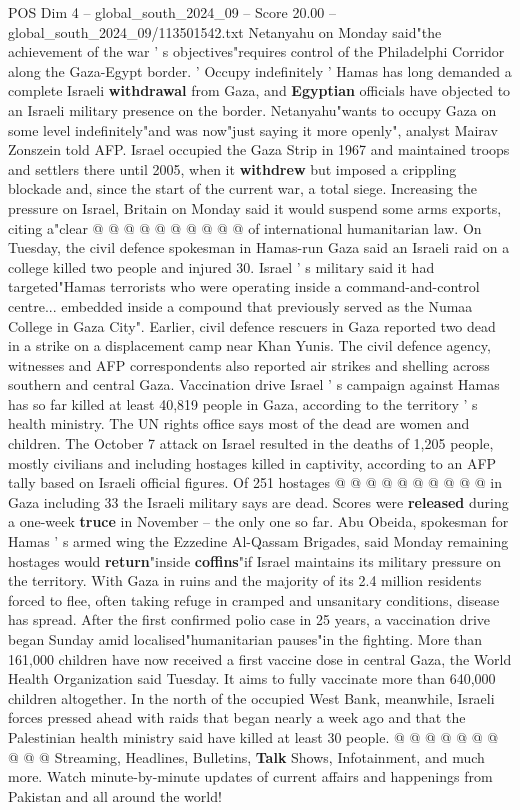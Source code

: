 \begin{textsample}{POS Dim 4 – global\_south\_2024\_09 – Score 20.00 – global\_south\_2024\_09/113501542.txt}
Netanyahu on Monday said"the achievement of the war ' s objectives"requires control of the Philadelphi Corridor along the Gaza-Egypt border. ' Occupy indefinitely ' Hamas has long demanded a complete Israeli \textbf{withdrawal} from Gaza, and \textbf{Egyptian} officials have objected to an Israeli military presence on the border.
Netanyahu"wants to occupy Gaza on some level indefinitely"and was now"just saying it more openly", analyst Mairav Zonszein told AFP.
Israel occupied the Gaza Strip in 1967 and maintained troops and settlers there until 2005, when it \textbf{withdrew} but imposed a crippling blockade and, since the start of the current war, a total siege.
Increasing the pressure on Israel, Britain on Monday said it would suspend some arms exports, citing a"clear @ @ @ @ @ @ @ @ @ @ of international humanitarian law.
On Tuesday, the civil defence spokesman in Hamas-run Gaza said an Israeli raid on a college killed two people and injured 30.
Israel ' s military said it had targeted"Hamas terrorists who were operating inside a command-and-control centre... embedded inside a compound that previously served as the Numaa College in Gaza City".
Earlier, civil defence rescuers in Gaza reported two dead in a strike on a displacement camp near Khan Yunis.
The civil defence agency, witnesses and AFP correspondents also reported air strikes and shelling across southern and central Gaza.
Vaccination drive Israel ' s campaign against Hamas has so far killed at least 40,819 people in Gaza, according to the territory ' s health ministry.
The UN rights office says most of the dead are women and children.
The October 7 attack on Israel resulted in the deaths of 1,205 people, mostly civilians and including hostages killed in captivity, according to an AFP tally based on Israeli official figures.
Of 251 hostages @ @ @ @ @ @ @ @ @ @ in Gaza including 33 the Israeli military says are dead.
Scores were \textbf{released} during a one-week \textbf{truce} in November -- the only one so far.
Abu Obeida, spokesman for Hamas ' s armed wing the Ezzedine Al-Qassam Brigades, said Monday remaining hostages would \textbf{return}"inside \textbf{coffins}"if Israel maintains its military pressure on the territory.
With Gaza in ruins and the majority of its 2.4 million residents forced to flee, often taking refuge in cramped and unsanitary conditions, disease has spread.
After the first confirmed polio case in 25 years, a vaccination drive began Sunday amid localised"humanitarian pauses"in the fighting.
More than 161,000 children have now received a first vaccine dose in central Gaza, the World Health Organization said Tuesday.
It aims to fully vaccinate more than 640,000 children altogether.
In the north of the occupied West Bank, meanwhile, Israeli forces pressed ahead with raids that began nearly a week ago and that the Palestinian health ministry said have killed at least 30 people. @ @ @ @ @ @ @ @ @ @ Streaming, Headlines, Bulletins, \textbf{Talk} Shows, Infotainment, and much more.
Watch minute-by-minute updates of current affairs and happenings from Pakistan and all around the world!


\end{textsample}
